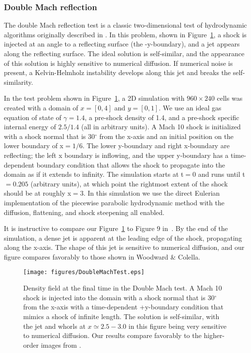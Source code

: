 \subsubsection{Double Mach reflection}
\label{sec.tests.doublemach}

The double Mach reflection test is a classic two-dimensional test of
hydrodynamic algorithms originally described in
\citet{1984JCoPh..54..115W} \citep[and more recently
in][]{2008ApJS..178..137S}.  In this problem, shown in
Figure~\ref{fig.doublemach}, a shock is injected at an angle to a
reflecting surface (the -y-boundary), and a jet appears along the
reflecting surface.  The ideal solution is self-similar, and the
appearance of this solution is highly sensitive to numerical
diffusion.  If numerical noise is present, a Kelvin-Helmholz
instability develops along this jet and breaks the self-similarity.

In the test problem shown in Figure~\ref{fig.doublemach}, a 2D
simulation with $960 \times 240$ cells was created with a domain of $x
= [0, 4]$ and $y = [0, 1]$.  We use an ideal gas equation of state of
$\gamma = 1.4$, a pre-shock density of 1.4, and a pre-shock specific
internal energy of $2.5/1.4$ (all in arbitrary units).  A Mach 10
shock is initialized with a shock normal that is 30$^\circ$ from the
x-axis and an initial position on the lower boundary of x$ = 1/6$.
The lower y-boundary and right x-boundary are reflecting; the left x
boundary is inflowing, and the upper y-boundary has a time-dependent
boundary condition that allows the shock to propagate into the domain
as if it extends to infinity.  The simulation starts at t$ = 0$ and
runs until t$ = 0.205$ (arbitrary units), at which point the rightmost
extent of the shock should be at roughly x$ = 3$.  In this simulation
we use the direct Eulerian implementation of the piecewise parabolic
hydrodynamic method with the diffusion, flattening, and shock
steepening all enabled.

It is instructive to compare our Figure~\ref{fig.doublemach} to Figure
9 in~\citet{1984JCoPh..54..115W}.  By the end of the simulation, a
dense jet is apparent at the leading edge of the shock, propagating
along the x-axis.  The shape of this jet is sensitive to numerical
diffusion, and our figure compares favorably to those shown in
Woodward \& Colella.

\begin{figure}
\begin{center}
\texttt{[image: figures/DoubleMachTest.eps]}
\caption{Density field at the final time in the Double Mach test.  A
Mach 10 shock is injected into the domain with a shock normal that is
30$^\circ$ from the x-axis with a time-dependent +y-boundary condition
that mimics a shock of infinite length.  The solution is self-similar,
with the jet and whorls at $x \simeq 2.5-3.0$ in this figure being
very sensitive to numerical diffusion.  Our results compare favorably
to the higher-order images from \citet{1984JCoPh..54..115W}.}
\label{fig.doublemach}
\end{center}
\end{figure}
